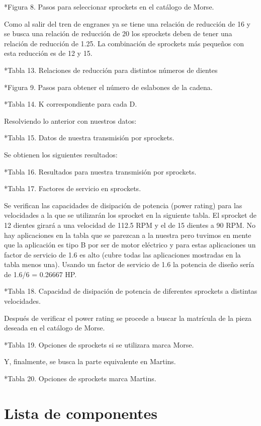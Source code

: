 *Figura 8. Pasos para seleccionar sprockets en el catálogo de Morse.

Como al salir del tren de engranes ya se tiene una relación de reducción de 16 y se busca una relación de reducción de 20 los sprockets deben de tener una relación de reducción de 1.25. La combinación de sprockets más pequeños con esta reducción es de 12 y 15.

*Tabla 13. Relaciones de reducción para distintos números de dientes

*Figura 9. Pasos para obtener el número de eslabones de la cadena.

*Tabla 14. K correspondiente para cada D.

Resolviendo lo anterior con nuestros datos:

*Tabla 15. Datos de nuestra transmisión por sprockets.

Se obtienen los siguientes resultados:

*Tabla 16. Resultados para nuestra transmisión por sprockets.

*Tabla 17. Factores de servicio en sprockets.

Se verifican las capacidades de disipación de potencia (power rating) para las velocidades a la que se utilizarán los sprocket en la siguiente tabla. El sprocket de 12 dientes girará a una velocidad de 112.5 RPM y el de 15 dientes a 90 RPM. No hay aplicaciones en la tabla que se parezcan a la nuestra pero tuvimos en mente que la aplicación es tipo B por ser de motor eléctrico y para estas aplicaciones un factor de servicio de 1.6 es alto (cubre todas las aplicaciones mostradas en la tabla menos una). Usando un factor de servicio de 1.6 la potencia de diseño sería de 1.6/6 = 0.26667 HP.

*Tabla 18. Capacidad de disipación de potencia de diferentes sprockets a distintas velocidades.

Después de verificar el power rating se procede a buscar la matrícula de la pieza deseada en el catálogo de Morse.

*Tabla 19. Opciones de sprockets si se utilizara marca Morse.

Y, finalmente, se busca la parte equivalente en Martins.

*Tabla 20. Opciones de sprockets marca Martins.

\section{Lista de componentes}

